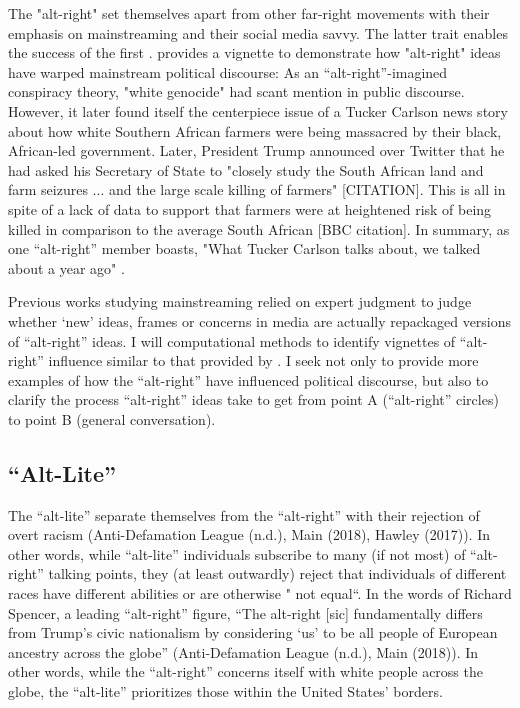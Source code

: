 \documentclass[acmlarge, screen, authorversion]{acmart}
\begin{document}
The "alt-right" set themselves apart from other far-right movements with their emphasis on mainstreaming and their social media savvy. The latter trait enables the success of the first \cite{sternProudBoysWhite2019, nagleKillAllNormies2017, gallaherMainstreamingWhiteSupremacy2020}. 
\citet{sternProudBoysWhite2019} provides a vignette to demonstrate how "alt-right" ideas have warped mainstream political discourse: As an ``alt-right''-imagined conspiracy theory, "white genocide" had scant mention in public discourse. However, it later found itself the centerpiece issue of a Tucker Carlson news story about how white Southern African farmers were being massacred by their black, African-led government. Later, President Trump announced over Twitter that he had asked his Secretary of State to "closely study the South African land and farm seizures ... and the large scale killing of farmers" [CITATION]. This is all in spite of a lack of data to support that farmers were at heightened risk of being killed in comparison to the average South African [BBC citation]. In summary, as one ``alt-right'' member boasts, "What Tucker Carlson talks about, we talked about a year ago" \cite{janetreitmanLawEnforcementFailed2018}.

Previous works studying mainstreaming relied on expert judgment to judge whether `new' ideas, frames or concerns in media are actually repackaged versions of ``alt-right'' ideas. I will computational methods to identify vignettes of ``alt-right'' influence similar to that provided by \citet{sternProudBoysWhite2019}. I seek not only to provide more examples of how the ``alt-right'' have influenced political discourse, but also to clarify the process ``alt-right'' ideas take to get from point A (``alt-right'' circles) to point B (general conversation).

\subsection{“Alt-Lite”}

The “alt-lite” separate themselves from the “alt-right” with their
rejection of overt racism (Anti-Defamation League (n.d.), Main (2018),
Hawley (2017)). In other words, while “alt-lite” individuals subscribe
to many (if not most) of “alt-right” talking points, they (at least
outwardly) reject that individuals of different races have different
abilities or are otherwise " not equal“. In the words of Richard
Spencer, a leading ``alt-right'' figure, “The alt-right [sic] fundamentally
differs from Trump’s civic nationalism by considering ‘us’ to be all
people of European ancestry across the globe” (Anti-Defamation League
(n.d.), Main (2018)). In other words, while the “alt-right” concerns
itself with white people across the globe, the “alt-lite” prioritizes
those within the United States’ borders.
\end{document}
